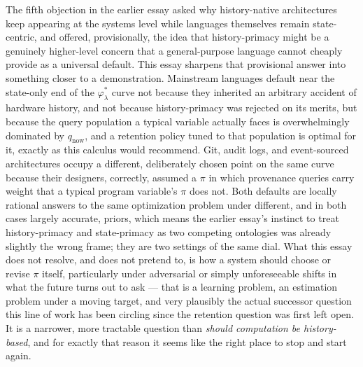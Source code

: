 \documentclass[11pt]{article}
\begin{document}
The fifth objection in the earlier essay asked why history-native architectures keep appearing at the systems level while languages themselves remain state-centric, and offered, provisionally, the idea that history-primacy might be a genuinely higher-level concern that a general-purpose language cannot cheaply provide as a universal default. This essay sharpens that provisional answer into something closer to a demonstration. Mainstream languages default near the state-only end of the $\varphi_\lambda^{*}$ curve not because they inherited an arbitrary accident of hardware history, and not because history-primacy was rejected on its merits, but because the query population a typical variable actually faces is overwhelmingly dominated by $q_{\mathrm{now}}$, and a retention policy tuned to that population is optimal for it, exactly as this calculus would recommend. Git, audit logs, and event-sourced architectures occupy a different, deliberately chosen point on the same curve because their designers, correctly, assumed a $\pi$ in which provenance queries carry weight that a typical program variable's $\pi$ does not. Both defaults are locally rational answers to the same optimization problem under different, and in both cases largely accurate, priors, which means the earlier essay's instinct to treat history-primacy and state-primacy as two competing ontologies was already slightly the wrong frame; they are two settings of the same dial. What this essay does not resolve, and does not pretend to, is how a system should choose or revise $\pi$ itself, particularly under adversarial or simply unforeseeable shifts in what the future turns out to ask --- that is a learning problem, an estimation problem under a moving target, and very plausibly the actual successor question this line of work has been circling since the retention question was first left open. It is a narrower, more tractable question than \emph{should computation be history-based}, and for exactly that reason it seems like the right place to stop and start again.
\end{document}
